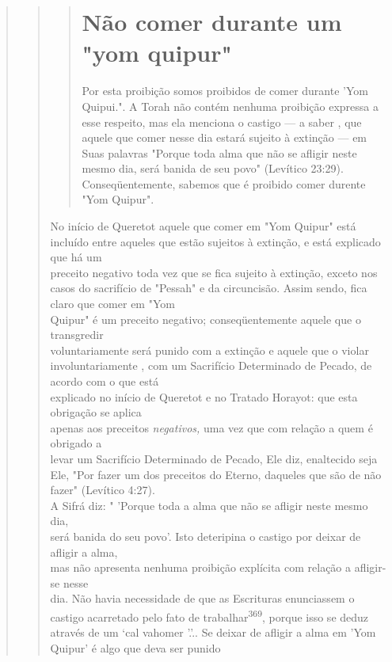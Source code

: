 \begin{quote}
\begin{quote}
\begin{quote}

\section{Não comer durante um "yom quipur"}

Por esta proibição somos proibidos de comer durante 'Yom
Qui­pui.". A Torah não contém nenhuma proibição
expressa a esse respeito, mas ela menciona o castigo --- a saber , que
aquele que comer nesse dia estará sujei­to à extinção --- em Suas
palavras "Porque toda alma que não se afligir neste mesmo dia, será
banida de seu povo" (Levítico 23:29). Conseqüentemente, sa­bemos que é
proibido comer durente "Yom Quipur".
\end{quote}

No início de Queretot aquele que comer em "Yom Quipur" está incluído
entre aqueles que estão sujeitos à extinção, e está explicado que
há um\\
preceito negativo toda vez que se fica sujeito à extinção, exceto nos
casos do sacrifício
de "Pessah" e da circuncisão. Assim sendo, fica claro que comer
em "Yom\\
Quipur" é um preceito negativo; conseqüentemente aquele que o
transgredir\\
voluntariamente será punido com a extinção e aquele que o violar
involuntariamente
, com um Sacrifício Determinado de Pecado, de acordo com o que
está\\
explicado no início de Queretot e no Tratado Horayot: que esta obrigação
se aplica\\
apenas aos preceitos \emph{negativos,} uma vez que com relação a quem é
obrigado a\\
levar um Sacrifício Determinado de Pecado, Ele diz, enaltecido seja Ele,
"Por fazer
um dos preceitos do Eterno, daqueles que são de não fazer" (Levítico
4:27).\\
A Sifrá diz: " 'Porque toda a alma que não se afligir neste mesmo dia,\\
será banida do seu povo'. Isto deteripina o castigo por deixar de
afligir a alma,\\
mas não apresenta nenhuma proibição explícita com relação a afligir-se
nesse\\
dia. Não havia necessidade de que as Escrituras enunciassem o castigo
acarretado
pelo fato de trabalhar\textsuperscript{369}, porque isso se deduz
através de um `cal vahomer
'.'.. Se deixar de afligir a alma
em 'Yom Quipur' é algo que deva ser punido

\end{quote}
\end{quote}
